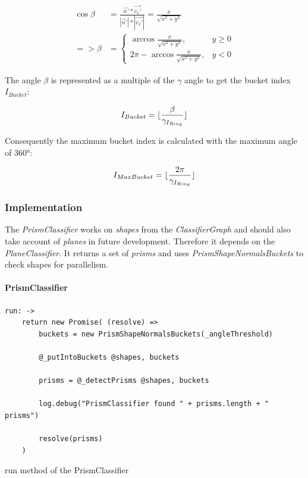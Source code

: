\documentclass[../ClassicThesis.tex]{subfiles}
\begin{document}
\begin{equation}
\begin{split}
    \cos{\beta} & = \frac{\vec{n}' * \vec{v_{x}'}}{|\vec{n}'| * |\vec{v_{x}'}|} = \frac{x}{\sqrt{x^{2} + y^{2}}} \\
    => \beta & = \begin{cases}
        \arccos{ \frac{x}{\sqrt{x^{2} + y^{2}}} }, & y \geq 0 \\
        2 \pi - \arccos{ \frac{x}{\sqrt{x^{2} + y^{2}}} }, & y < 0
    \end{cases}
\end{split}
\end{equation}

The angle $ \beta $ is represented as a multiple of the $ \gamma $ angle to get the bucket index $ I_{Bucket} $:

\begin{equation}
    I_{Bucket} = \lfloor\frac{\beta}{ {\gamma}_{I_{Ring}} }\rfloor
\end{equation}

Consequently the maximum bucket index is calculated with the maximum angle of 360°:

\begin{equation}
    I_{MaxBucket} = \lfloor\frac{2 \pi}{ {\gamma}_{I_{Ring}} }\rfloor
\end{equation}



\subsubsection{Implementation}


The \emph{PrismClassifier} works on \emph{shapes} from the \emph{ClassifierGraph} and should also take account of \emph{planes} in future development. Therefore it depends on the \emph{PlaneClassifier}. It returns a set of \emph{prisms} and uses \emph{PrismShapeNormalsBuckets} to check shapes for parallelism.

\paragraph{PrismClassifier}

\begin{listing}[!h]
\centering
\begin{verbatim}
run: ->
    return new Promise( (resolve) =>
        buckets = new PrismShapeNormalsBuckets(_angleThreshold)

        @_putIntoBuckets @shapes, buckets

        prisms = @_detectPrisms @shapes, buckets

        log.debug("PrismClassifier found " + prisms.length + " prisms")

        resolve(prisms)
    )
\end{verbatim}
\caption{run method of the PrismClassifier}
\label{lst:PrismClassifierRun}
\end{listing}
\end{document}
